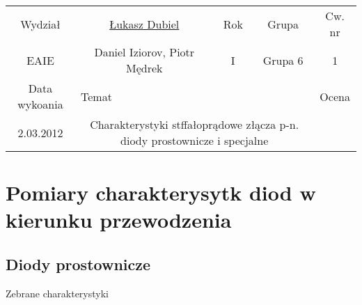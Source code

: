 \documentclass[11pt]{article}
\begin{document}
\begin{center}
\begin{tabular}{|c|c|c|c|c|}
\hline
Wydział & \underline{Łukasz Dubiel} & Rok & Grupa & Cw. nr \\
EAIE & Daniel Iziorov, Piotr Mędrek & I & Grupa 6 & 1 \\
\hline
Data wykoania & \multicolumn{3}{|l|}{Temat} & Ocena \\
2.03.2012 &  \multicolumn{3}{|p{10.5cm}|}{Charakterystyki stffałoprądowe złącza p-n. diody prostownicze i specjalne} & \\
\hline
\end{tabular}
\end{center}

\section{Pomiary charakterysytk diod w kierunku przewodzenia}
\VZero
\subsection{Diody prostownicze}
Zebrane charakterystyki

\end{document}
